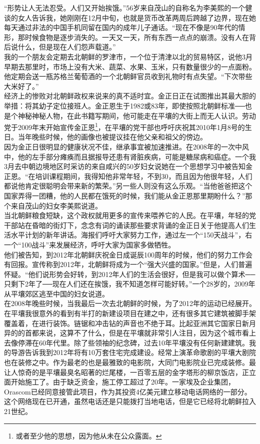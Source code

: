 “形势让人无法忍受。人们又开始挨饿。”56岁来自茂山的自称名为李美熙的一个健谈的女人告诉我，她刚刚在12月中旬，也就是货币改革两周后跨越了边界，现在她每天通过非法的中国手机同留在国内的成年儿子通话。“现在不像是90年代的情形，那时候食物是逐步消失的。一天又一天，所有东西一点点的崩溃。没有人在背后说什么，但是现在人们怨声载道。”\\

我的一个朋友会定期去北朝鲜的罗津市，一个位于清津以北的贸易特区，说他3月早期去那里时，市场上没有大米、蔬菜、水果、玉米，只有数量很少的一点面粉。他定期会送一瓶苏格兰葡萄酒的一个北朝鲜官员收到礼物时有点失望。“下次带些大米好了。”\\

经济上的惨败对北朝鲜政权来说来的真不适时宜。金正日正在试图推出其最大胆的举措：将其幼子定位接班人。金正恩生于1982或83年，即使按照北朝鲜标准──也是个神秘神秘人物，在此书籍写期间，他可能走在平壤的大街上而无人认识。劳动党于2009年末开始宣传金正恩\footnote{或者至少他的思想，因为他从未在公众露面。}，在平壤的党干部也呼吁庆祝其2010年1月8号的生日。当年晚些时候，他的画像也被提议挂在他父亲和祖父的傍边。\\

因为金正日很明显的健康状况不佳，继承事宜被加速推进。在2008年的一次中风中，他的左手部分瘫痪而且据报导还患有肾脏疾病，可能是糖尿病和癌症。一个我3月去中朝边境地区时采访的来自咸兴的50岁妇女说她在一个思想学习中被告知金正恩。“在培训课程期间，我得知他非常年轻，不到30，而且因为他很年轻，人们都说他肯定很聪明会带来新的繁荣。”另一些人则没有这么乐观。“当他爸爸把这个国家弄得一团糟，他的人民都在饿死的时候，我们能从金正恩那里期盼什么？”那个来自茂山的妇女李美熙说道。\\

当北朝鲜粮食短缺，这个政权就用更多的宣传来喂养它的人民。在平壤，年轻的党干部站在昏暗的街灯下，念念有词的诵读那些要求背诵的金正日关于他提高人们生活水平计划的新年讲话。海报们呼吁大家努力工作，通过左一个“150天战斗”，右一个“100战斗”来发展经济，呼吁大家为国家多做牺牲。\\

他们被告知，到2012年北朝鲜庆祝金日成诞辰100周年的时候，他们的努力工作会有回报。宣传称到2012年，北朝鲜将成为一个“强大兴盛的国家。”但是，人们普遍怀疑。“他们说形势会好转，到2012年人们的生活会很好，但是我可以做个算术──只剩下2年了──现在人们还在挨饿，我不知道怎样可能好转。”一个28岁的，2009年从平壤郊区逃至中国的妇女说道。\\

在2008年晚些时候，当我最后一次去北朝鲜的时候，为了2012年的运动已经展开。在平壤我很意外的看到有半打的新建设项目在建之中，还有很多其它建筑被脚手架覆盖着，在进行装饰。链锯和冲击钻的声音也不绝于耳。比起亚洲其它国家日新月异的的首都来说，这算不了什么，但是在平壤就非常引人注目，因为这个城市看上去像停滞在60年代里。除了些领袖的纪念碑，过去10年平壤没有任何新建建筑。我的导游告诉我到2012年将有10万套住宅完成建设。经常上演革命歌剧的平壤大剧院也在装修之中。作为最老的也是最雅致的电影院，大同门电影院业已完成装修。最让人惊奇的是平壤最臭名昭著的烂尾楼，一百零五层的金字塔形的柳京饭店，正立面开始施工了。由于缺乏资金，施工停工超过了20年。一家埃及企业集团，Orascom已经同意接管此项目，作为其投资4亿美元建立移动电话网络的一部分。这个网络现在已开通，虽然电话还是只能拨打当地电话，但是它已经将北朝鲜拉入21世纪。\\

